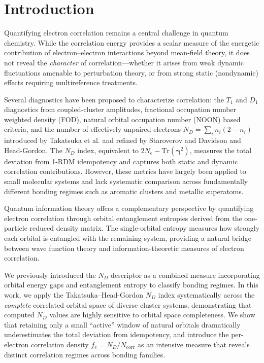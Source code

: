 \documentclass[12pt,a4paper]{article}
\begin{document}
\section{Introduction}

Quantifying electron correlation remains a central challenge in quantum chemistry.
While the correlation energy provides a scalar measure of the energetic contribution
of electron--electron interactions beyond mean-field theory,\cite{lowdin1959}
it does not reveal the \emph{character} of correlation---whether it arises from
weak dynamic fluctuations amenable to perturbation theory, or from strong
static (nondynamic) effects requiring multireference treatments.\cite{lyakh2012}

Several diagnostics have been proposed to characterize correlation:
the $T_1$ and $D_1$ diagnostics from coupled-cluster amplitudes,\cite{lee1989}
fractional occupation number weighted density (FOD),\cite{grimme2015}
natural orbital occupation number (NOON) based criteria,\cite{pulay1988}
and the number of effectively unpaired electrons $N_D = \sum_i n_i(2-n_i)$
introduced by Takatsuka et al.\cite{takatsuka1978} and refined by
Staroverov and Davidson\cite{staroverov2000} and Head-Gordon.\cite{headgordon2003}
The $N_D$ index, equivalent to $2N_e - \mathrm{Tr}(\boldsymbol{\gamma}^2)$,
measures the total deviation from 1-RDM idempotency and captures both
static and dynamic correlation contributions.
However, these metrics have largely been applied to small molecular systems and
lack systematic comparison across fundamentally different bonding regimes
such as aromatic clusters and metallic superatoms.

Quantum information theory offers a complementary perspective by quantifying
electron correlation through orbital entanglement entropies derived from
the one-particle reduced density matrix.\cite{rissler2006,boguslawski2012,ding2021}
The single-orbital entropy measures how strongly each orbital is entangled
with the remaining system, providing a natural bridge between wave function
theory and information-theoretic measures of electron correlation.

We previously introduced the $N_D$ descriptor as a combined measure
incorporating orbital energy gaps and entanglement entropy to classify
bonding regimes.\cite{arda2025fbond} In this work, we apply the
Takatsuka--Head-Gordon $N_D$ index\cite{takatsuka1978,headgordon2003}
systematically across the \emph{complete} correlated orbital space of diverse
cluster systems, demonstrating that computed $N_D$ values are highly sensitive
to orbital space completeness. We show that retaining only a small ``active''
window of natural orbitals dramatically underestimates the total deviation
from idempotency, and introduce the per-electron correlation density
$f_e = N_D/N_{\text{corr}}$ as an intensive measure that reveals distinct correlation
regimes across bonding families.
\end{document}

